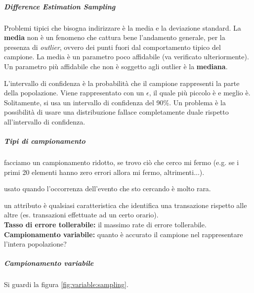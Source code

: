 \subparagraph*{Difference Estimation Sampling}

Problemi tipici che bisogna indirizzare è la media e la deviazione standard.
La \textbf{media} non è un fenomeno che cattura bene l'andamento generale, per la
presenza di \textit{outlier}, ovvero dei punti fuori dal comportamento
tipico del campione.
La media è un parametro poco affidabile (va verificato ulteriormente). Un
parametro più affidabile che non è soggetto agli
outlier è la \textbf{mediana}.

L'intervallo di confidenza è la probabilità che il campione rappresenti la parte
della popolazione. Viene rappresentato con un $\epsilon$, il quale più piccolo è e
meglio è. Solitamente, si usa un intervallo di confidenza del 90\%. Un problema
è la possibilità di usare una distribuzione fallace completamente duale rispetto
all'intervallo di confidenza.


\subparagraph*{Tipi di campionamento}

 facciamo un campionamento ridotto, se trovo
ciò che cerco mi fermo (e.g. se i primi 20 elementi hanno zero errori allora mi fermo,
altrimenti...).

 usato quando l'occorrenza dell'evento che
sto cercando è molto rara.

 un attributo è qualsiasi
caratteristica che identifica una transazione rispetto alle altre (es.
transazioni effettuate ad un certo orario).\\
\newline
\textbf{Tasso di errore tollerabile:} il massimo rate di errore
tollerabile.\\
\newline
\textbf{Campionamento variabile:} quanto è accurato il campione nel rappresentare
l'intera popolazione?


\subparagraph{Campionamento variabile}

Si guardi la figura \ref{fig:variable:sampling}.

